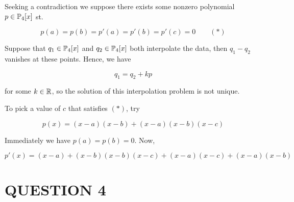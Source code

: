 \documentclass[a4paper]{article}
\begin{document}
%
%
%
%
%
%
%
%
%
%
%
%

Seeking a contradiction we suppose there exists some nonzero polynomial $ p \in \P_{4} [x] $ st. 

\[ p(a) = p(b) = p'(a) = p'(b) = p'(c) = 0 \qquad (*) \] 


Suppose that $ q_{1} \in \P_{4} [x] $ and $ q_{2} \in \P_{4} [x] $ both interpolate the data, then $ q_{1} - q_{2}  $ vanishes at these points. Hence, we have

\[ q_{1} = q_{2} + k p \]

for some $ k \in \R $, so the solution of this interpolation problem is not unique. 

To pick a value of $ c $ that satisfies $ (*) $, try

\[ p(x) = (x - a)(x - b) + (x - a)(x - b)(x - c) \]

Immediately we have $ p(a) = p(b) = 0 $. Now, 

\[ p'(x) =  (x- a) + (x - b)  (x - b)(x - c) +  (x - a)(x - c) +  (x - a)(x - b)   \]


\section{QUESTION 4}
\end{document}
